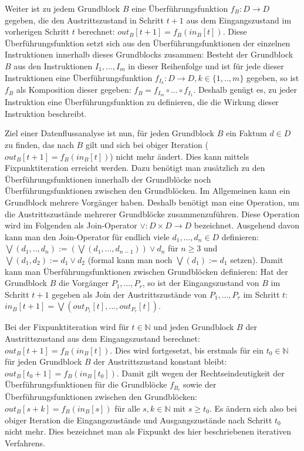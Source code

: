 Weiter ist zu jedem Grundblock $B$ eine Überführungsfunktion $f_B:D\to D$ gegeben, die den Austrittszustand in Schritt $t+1$ aus dem Eingangszustand im vorherigen Schritt $t$ berechnet: $out_B[t+1]=f_B(in_B[t])$.
Diese Überführungsfunktion setzt sich aus den Überführungsfunktionen der einzelnen Instruktionen innerhalb dieses Grundblocks zusammen:
Besteht der Grundblock $B$ aus den Instruktionen $I_1,...,I_m$ in dieser Reihenfolge und ist für jede dieser Instruktionen eine Überführungsfunktion $f_{I_k}:D\to D, k\in \{1,..,m\}$ gegeben, so ist $f_B$ als Komposition dieser gegeben: $f_B=f_{I_m}\circ ... \circ f_{I_1}$.
Deshalb genügt es, zu jeder Instruktion eine Überführungsfunktion zu definieren, die die Wirkung dieser Instruktion beschreibt.

Ziel einer Datenflussanalyse ist nun, für jeden Grundblock $B$ ein Faktum $d\in D$ zu finden, das nach $B$ gilt und sich bei obiger Iteration ($out_B[t+1]=f_B(in_B[t])$) nicht mehr ändert.
Dies kann mittels Fixpunktiteration erreicht werden.
Dazu benötigt man zusätzlich zu den Überführungsfunktionen innerhalb der Grundblöcke noch Überführungsfunktionen zwischen den Grundblöcken.
Im Allgemeinen kann ein Grundblock mehrere Vorgänger haben.
Deshalb benötigt man eine Operation, um die Austrittszustände mehrerer Grundblöcke zusammenzuführen.
Diese Operation wird im Folgenden als Join-Operator $\vee :D\times D \to D$ bezeichnet.
Ausgehend davon kann man den Join-Operator für endlich viele $d_1,...,d_n \in D$ definieren: $\bigvee (d_1,..,d_n):=(\bigvee(d_1,...,d_{n-1})) \vee d_n$ für $n \geq 3$ und $\bigvee(d_1,d_2):=d_1 \vee d_2$ (formal kann man noch $\bigvee (d_1):=d_1$ setzen).
Damit kann man Überführungsfunktionen zwischen Grundblöcken definieren: 
Hat der Grundblock $B$ die Vorgänger $P_1,...,P_r$, so ist der Eingangszustand von $B$ im Schritt $t+1$ gegeben als Join der Austrittszustände von $P_1,...,P_r$ im Schritt $t$: $in_B[t+1]=\bigvee(out_{P_1}[t],...,out_{P_r}[t])$.

Bei der Fixpunktiteration wird für $t \in \mathbb{N}$ und jeden Grundblock $B$ der Austrittszustand aus dem Eingangszustand berechnet: $out_B[t+1]=f_B(in_B[t])$. 
Dies wird fortgesetzt, bis erstmals für ein $t_0 \in \mathbb{N}$ für jeden Grundblock $B$ der Austrittszustand konstant bleibt: $out_B[t_0+1]=f_B(in_B[t_0])$.
Damit gilt wegen der Rechtseindeutigkeit der Überführungsfunktionen für die Grundblöcke $f_{B_i}$ sowie der Überführungsfunktionen zwischen den Grundblöcken: $out_B[s+k]=f_B(in_B[s])$ für alle $s,k \in \mathbb{N}$ mit $s \geq t_0$.
Es ändern sich also bei obiger Iteration die Eingangszustände und Ausgangszustände nach Schritt $t_0$ nicht mehr.
Dies bezeichnet man als Fixpunkt des hier beschriebenen iterativen Verfahrens.

